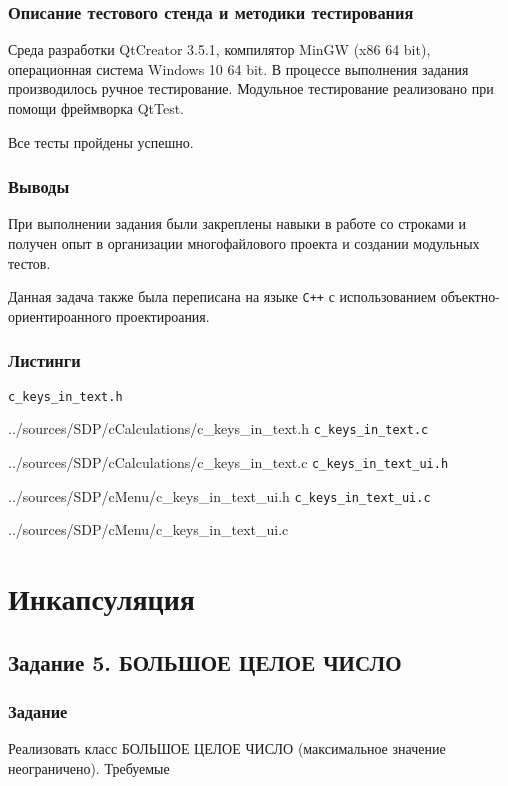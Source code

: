 \documentclass[12pt,a4paper]{report}
\begin{document}
\subsection{Описание тестового стенда и методики тестирования}
\hspace{\parindent}Среда разработки QtCreator 3.5.1, компилятор MinGW (x86 64 bit), операционная система Windows 10 64 bit.
В процессе выполнения задания производилось ручное тестирование.
Модульное тестирование реализовано при помощи фреймворка QtTest.

Все тесты пройдены успешно.
\subsection{Выводы}
\hspace{\parindent}При выполнении задания были закреплены навыки в работе со строками и получен опыт в организации многофайлового проекта и создании модульных тестов.

Данная задача также была переписана на языке \verb|C++| с использованием объектно-ориентироанного проектироания.

\newpage
\subsection{Листинги}
\verb+c_keys_in_text.h+

{../sources/SDP/cCalculations/c_keys_in_text.h}
\verb+c_keys_in_text.c+

{../sources/SDP/cCalculations/c_keys_in_text.c}
\verb+c_keys_in_text_ui.h+

{../sources/SDP/cMenu/c_keys_in_text_ui.h}
\verb+c_keys_in_text_ui.c+

{../sources/SDP/cMenu/c_keys_in_text_ui.c}





\newpage
\chapter{Инкапсуляция}
\section{Задание 5. БОЛЬШОЕ ЦЕЛОЕ ЧИСЛО}
\subsection{Задание}

\hspace{\parindent}Реализовать класс БОЛЬШОЕ ЦЕЛОЕ ЧИСЛО (максимальное значение неограничено). Требуемые 
\end{document}
